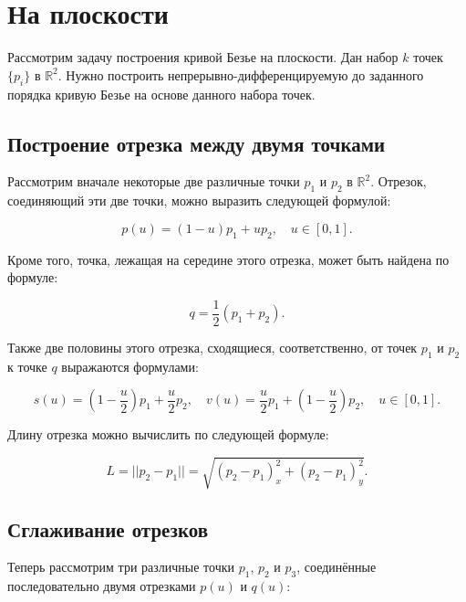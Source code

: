 \section{На плоскости}

Рассмотрим задачу построения кривой Безье на плоскости. Дан набор $k$ точек $\{p_i\}$ в $\mathbb{R}^2$.
Нужно построить непрерывно-дифференци\-руемую до заданного порядка кривую Безье на основе данного набора точек.

\subsection*{Построение отрезка между двумя точками}

Рассмотрим вначале некоторые две различные точки $p_1$ и $p_2$ в $\mathbb{R}^2$. Отрезок, соединяющий эти две точки,
можно выразить следующей формулой:

\begin{equation}
p(u)=(1-u)p_1+up_2, \quad u \in [0,1].
\label{plane-segment}
\end{equation}

Кроме того, точка, лежащая на середине этого отрезка, может быть найдена по формуле:

\begin{equation}
q=\frac{1}{2}(p_1+p_2).
\label{plane-segment-mid}
\end{equation}

Также две половины этого отрезка, сходящиеся, соответственно, от точек $p_1$ и $p_2$ к точке $q$ выражаются формулами:

\begin{equation}
s(u)=(1-\frac{u}{2})p_1+\frac{u}{2}p_2, \quad v(u)=\frac{u}{2}p_1+(1-\frac{u}{2})p_2, \quad u \in [0,1].
\label{plane-segment-halfs}
\end{equation}

Длину отрезка можно вычислить по следующей формуле:

\begin{equation}
L=||p_2-p_1||=\sqrt{(p_2-p_1)_x^2+(p_2-p_1)_y^2}.
\label{plane-segment-length}
\end{equation}

\subsection*{Сглаживание отрезков}

Теперь рассмотрим три различные точки $p_1$, $p_2$ и $p_3$, соединённые последовательно двумя отрезками $p(u)$ и $q(u)$:

